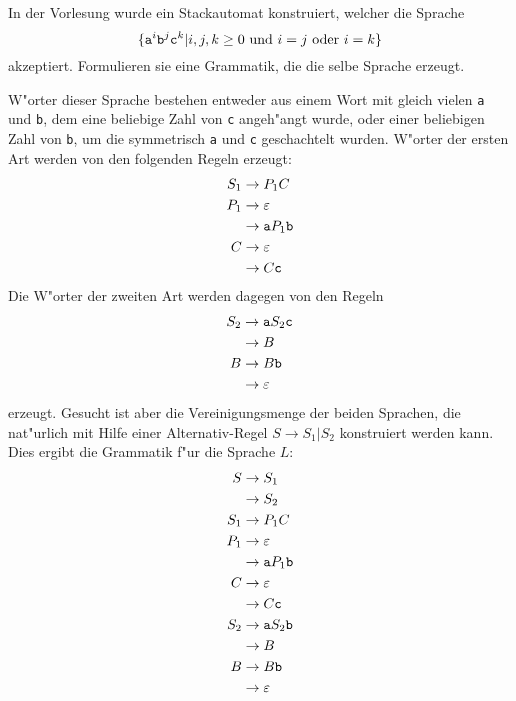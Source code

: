 In der Vorlesung wurde ein Stackautomat konstruiert, welcher die
Sprache
\[
\{{\tt a}^i{\tt b}^j{\tt c}^k|\text{$i,j,k\ge 0$ und $i=j$ oder $i=k$}\}
\]
akzeptiert.
Formulieren sie eine Grammatik, die die selbe Sprache erzeugt.

\begin{loesung}
W"orter dieser Sprache bestehen entweder aus einem Wort mit gleich
vielen {\tt a} und {\tt b}, dem eine beliebige Zahl von {\tt c}
angeh"angt wurde, oder einer beliebigen Zahl von {\tt b}, um die
symmetrisch {\tt a} und {\tt c} geschachtelt wurden.
W"orter der ersten Art werden von den folgenden Regeln erzeugt:
\begin{align*}
S_1&\to P_1C\\
P_1&\to\varepsilon\\
   &\to {\tt a}P_1{\tt b}\\
C  &\to\varepsilon\\
   &\to C{\tt c}
\end{align*}
Die W"orter der zweiten Art werden dagegen von den Regeln
\begin{align*}
S_2&\to{\tt a}S_2{\tt c}\\
   &\to B\\
B  &\to B{\tt b}\\
   &\to\varepsilon
\end{align*}
erzeugt.
Gesucht ist aber die Vereinigungsmenge der beiden Sprachen, die
nat"urlich mit Hilfe einer Alternativ-Regel $S\to S_1|S_2$
konstruiert werden kann.
Dies ergibt die Grammatik f"ur die Sprache $L$:
\begin{align*}
S  &\to S_1\\
   &\to S_2\\
S_1&\to P_1C\\
P_1&\to\varepsilon\\
   &\to {\tt a}P_1{\tt b}\\
C  &\to\varepsilon\\
   &\to C{\tt c}\\
S_2&\to{\tt a}S_2{\tt b}\\
   &\to B\\
B  &\to B{\tt b}\\
   &\to\varepsilon
\end{align*}
\end{loesung}
